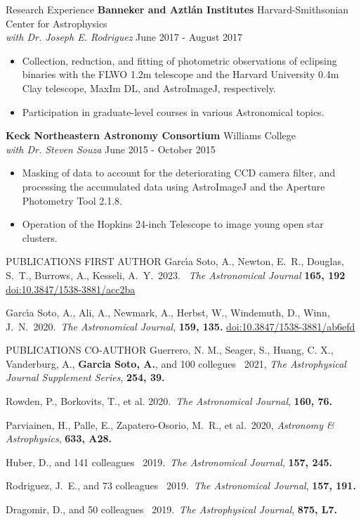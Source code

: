 \documentclass{resume} %
\begin{document}
\begin{rSection}{Research Experience}
{\bf Banneker and Aztl\'an Institutes}
{\hfill Harvard-Smithsonian Center for Astrophysics} \\
{\sl with Dr. Joseph E. Rodriguez} \hfill June 2017 - August 2017
\begin{itemize} \itemsep -6pt
\item Collection, reduction, and fitting of photometric observations of eclipsing binaries with the FLWO 1.2m telescope and the Harvard University 0.4m Clay telescope, MaxIm DL, and AstroImageJ, respectively.
\item Participation in graduate-level courses in various Astronomical topics.
\end{itemize}

{\bf Keck Northeastern Astronomy Consortium} \hfill Williams College  \\
{\sl with Dr. Steven Souza} \hfill June 2015 - October 2015 
\begin{itemize} \itemsep -6pt %
\item Masking of data to account for the deteriorating CCD camera filter, and processing the accumulated data using AstroImageJ and the Aperture Photometry Tool 2.1.8.
\item Operation of the Hopkins 24-inch Telescope to image young open star clusters.
\end{itemize}


\end{rSection}

\begin{rSection}{PUBLICATIONS FIRST AUTHOR}
Garc{\'\i}a Soto, A., Newton, E.~R., Douglas, S.~T., Burrows, A., Kesseli, A.~Y.\ 2023. \ \textit{The Astronomical Journal} \textbf{165, 192} \href{https://ui.adsabs.harvard.edu/abs/2023AJ....165..192G/abstract}{doi:10.3847/1538-3881/acc2ba}

Garc{\'\i}a Soto, A., Ali, A., Newmark, A., Herbst, W., Windemuth, D., Winn, J.~N.\ 2020.\ \textit{The Astronomical Journal}, \textbf{159, 135.} \href{https://ui.adsabs.harvard.edu/abs/2020AJ....159..135G/abstract}{doi:10.3847/1538-3881/ab6efd}
\end{rSection}

\begin{rSection}{PUBLICATIONS CO-AUTHOR}
Guerrero, N. M., Seager, S., Huang, C. X., Vanderburg, A., \textbf{Garcia Soto, A.}, and  100 collegues \ 2021, \textit{The Astrophysical Journal Supplement Series}, \textbf{254, 39.} 

Rowden, P., Borkovits, T., et al. 2020.\  \textit{The Astronomical Journal}, \textbf{160, 76.}

Parviainen, H., Palle, E., Zapatero-Osorio, M.~R., et al.\ 2020, \textit{Astronomy \& Astrophysics}, \textbf{ 633, A28.} 

Huber, D., and 141 colleagues \ 2019.\  \textit{The Astronomical Journal}, \textbf{157, 245.}

Rodriguez, J.~E., and 73 colleagues \ 2019.\ \textit{The Astronomical Journal}, \textbf{157, 191.}

Dragomir, D., and 50 colleagues \ 2019.\ \textit{The Astrophysical Journal}, \textbf{875, L7.}

\end{rSection}
\end{document}
